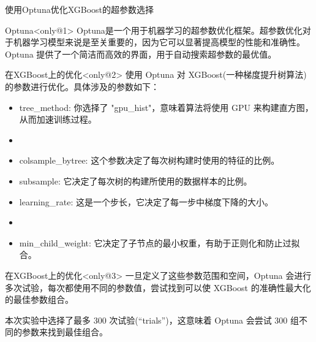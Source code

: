 \documentclass{beamer}
\begin{document}
\begin{frame}[fragile]{使用Optuna优化XGBoost的超参数选择}
	\begin{block}{Optuna}<only@1>
		Optuna是一个用于机器学习的超参数优化框架。超参数优化对于机器学习模型来说是至关重要的，因为它可以显著提高模型的性能和准确性。Optuna 提供了一个简洁而高效的界面，用于自动搜索超参数的最优值。
	\end{block}
	\begin{block}{在XGBoost上的优化}<only@2>
		使用 Optuna 对 XGBoost(一种梯度提升树算法)的参数进行优化。具体涉及的参数如下：

		\begin{itemize}
			\item tree\_method: 你选择了 "gpu\_hist"，意味着算法将使用 GPU 来构建直方图，从而加速训练过程。
			\item
			\item colsample\_bytree: 这个参数决定了每次树构建时使用的特征的比例。
			\item subsample: 它决定了每次树的构建所使用的数据样本的比例。
			\item learning\_rate: 这是一个步长，它决定了每一步中梯度下降的大小。
			\item
			\item min\_child\_weight: 它决定了子节点的最小权重，有助于正则化和防止过拟合。
		\end{itemize}

	\end{block}
	\begin{block}{在XGBoost上的优化}<only@3>
		一旦定义了这些参数范围和空间，Optuna 会进行多次试验，每次都使用不同的参数值，尝试找到可以使 XGBoost 的准确性最大化的最佳参数组合。

		本次实验中选择了最多 300 次试验(``trials'')，这意味着 Optuna 会尝试 300 组不同的参数来找到最佳组合。
	\end{block}
\end{frame}
\end{document}

